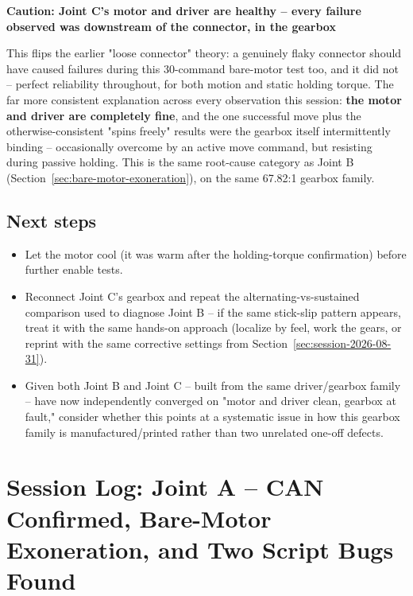 \documentclass[11pt,letterpaper]{article}
\newenvironment{caution}[1]{%
    \par\addvspace{8pt}%
    \noindent{\color{cautionred}\rule{\linewidth}{0.8pt}}\par\vspace{2pt}
    \noindent\textbf{\color{cautionred}Caution: #1}\par\vspace{2pt}
}{%
    \par\vspace{2pt}\noindent{\color{cautionred}\rule{\linewidth}{0.4pt}}%
    \par\addvspace{8pt}%
}
\begin{document}
\begin{caution}{Joint C's motor and driver are healthy -- every failure observed was downstream of the connector, in the gearbox}
This flips the earlier "loose connector" theory: a genuinely flaky connector should have caused failures during this 30-command bare-motor test too, and it did not -- perfect reliability throughout, for both motion and static holding torque. The far more consistent explanation across every observation this session: \textbf{the motor and driver are completely fine}, and the one successful move plus the otherwise-consistent "spins freely" results were the gearbox itself intermittently binding -- occasionally overcome by an active move command, but resisting during passive holding. This is the same root-cause category as Joint B (Section~\ref{sec:bare-motor-exoneration}), on the same 67.82:1 gearbox family.
\end{caution}

\subsection{Next steps}
\begin{itemize}
    \item Let the motor cool (it was warm after the holding-torque confirmation) before further enable tests.
    \item Reconnect Joint C's gearbox and repeat the alternating-vs-sustained comparison used to diagnose Joint B -- if the same stick-slip pattern appears, treat it with the same hands-on approach (localize by feel, work the gears, or reprint with the same corrective settings from Section~\ref{sec:session-2026-08-31}).
    \item Given both Joint B and Joint C -- built from the same driver/gearbox family -- have now independently converged on "motor and driver clean, gearbox at fault," consider whether this points at a systematic issue in how this gearbox family is manufactured/printed rather than two unrelated one-off defects.
\end{itemize}

\section{Session Log: Joint A -- CAN Confirmed, Bare-Motor Exoneration, and Two Script Bugs Found}
\label{sec:session-joint-a}
\end{document}
